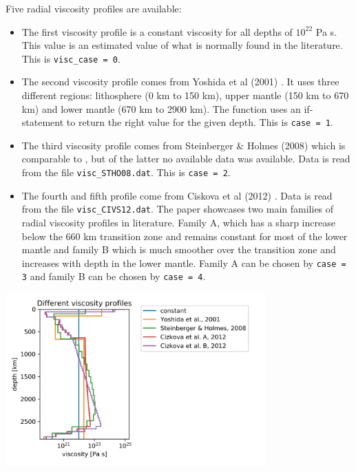 Five radial viscosity profiles are available:
\begin{itemize}
\item The first viscosity profile is a constant viscosity for all depths of $10^{22}$ Pa s. 
This value is an estimated value of what is normally found in the literature. This is \texttt{visc\_case = 0}. 

\item The second viscosity profile comes from Yoshida et al (2001) \cite{yohk01}. It uses three different regions: lithosphere (0 km to 150 km), upper mantle (150 km to 670 km) and lower mantle (670 km to 2900 km). The function uses an if-statement to return the right value for the given depth. This is \texttt{case = 1}.

\item The third viscosity profile comes from Steinberger \& Holmes (2008) \cite{stho08} 
which is comparable to \cite{stca06}, but of the latter no available data was available. 
Data is read from the file \texttt{visc\_STHO08.dat}. 
This is \texttt{case = 2}.

\item The fourth and fifth profile come from Ciskova et al (2012) \cite{civs12}. 
Data is read from the file \texttt{visc\_CIVS12.dat}. 
The paper showcases two main families of radial viscosity profiles in literature. Family A, which has a sharp 
increase below the 660 km transition zone and remains constant for most of the lower mantle 
and family B which is much smoother over the transition zone and increases with depth in the lower mantle. 
Family A can be chosen by \texttt{case = 3} and family B can be chosen by \texttt{case = 4}.

\end{itemize}

\begin{center}
\includegraphics[width=10cm]{python_codes/fieldstone_71/images/visc}
\end{center}


